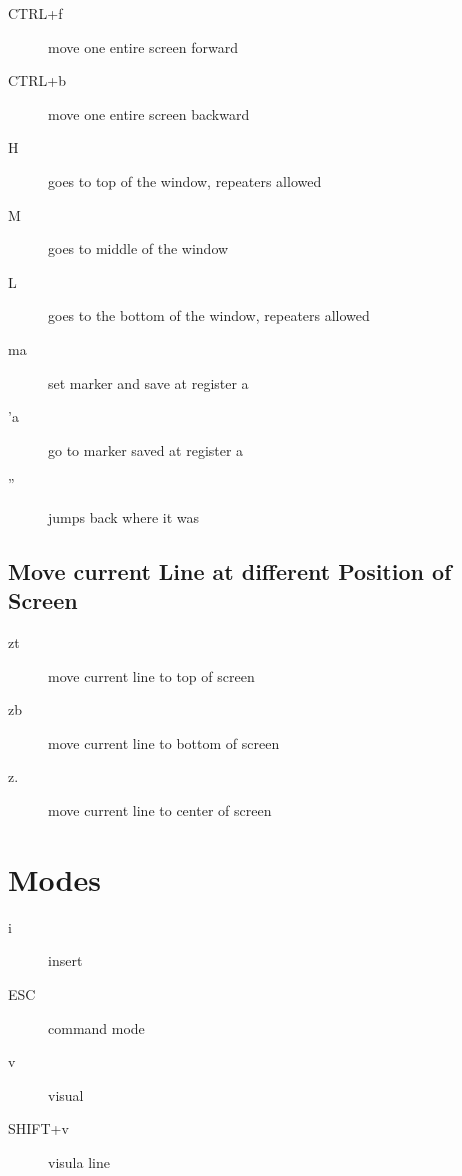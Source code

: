 \documentclass[a4paper, 12pt]{article}
\begin{document}
\begin{description}
	\item[CTRL+f] move one entire screen forward
	\item[CTRL+b] move one entire screen backward
	\item[H] goes to top of the window, repeaters allowed
	\item[M] goes to middle of the window
	\item[L] goes to the bottom of the window, repeaters allowed
	\item[ma] set marker and save at register a
	\item['a] go to marker saved at register a
	\item[''] jumps back where it was
\end{description}

\subsection{Move current Line at different Position of Screen}
\begin{description}
	\item[zt] move current line to top of screen
	\item[zb] move current line to bottom of screen
	\item[z.] move current line to center of screen
\end{description}

\section{Modes}
\begin{description}
	\item[i] insert
	\item[ESC] command mode
	\item[v] visual
	\item[SHIFT+v] visula line
\end{description}

\end{document}

